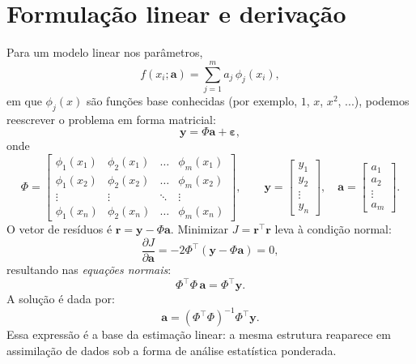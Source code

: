 \section{Formulação linear e derivação}
Para um modelo linear nos parâmetros,
\begin{equation}
f(x_i;\mathbf{a}) = \sum_{j=1}^{m} a_j \, \phi_j(x_i),
\label{eq:modelo-linear}
\end{equation}
em que $\phi_j(x)$ são funções base conhecidas (por exemplo, $1$, $x$, $x^2$, ...), podemos reescrever o problema em forma matricial:
\[
\mathbf{y} = \Phi \mathbf{a} + \boldsymbol{\varepsilon},
\]
onde
\[
\Phi =
\begin{bmatrix}
\phi_1(x_1) & \phi_2(x_1) & \dots & \phi_m(x_1) \\
\phi_1(x_2) & \phi_2(x_2) & \dots & \phi_m(x_2) \\
\vdots & \vdots & \ddots & \vdots \\
\phi_1(x_n) & \phi_2(x_n) & \dots & \phi_m(x_n)
\end{bmatrix},
\qquad
\mathbf{y} = 
\begin{bmatrix}
y_1 \\ y_2 \\ \vdots \\ y_n
\end{bmatrix},
\quad
\mathbf{a} = 
\begin{bmatrix}
a_1 \\ a_2 \\ \vdots \\ a_m
\end{bmatrix}.
\]
O vetor de resíduos é $\boldsymbol{r} = \mathbf{y} - \Phi\mathbf{a}$.  
Minimizar $J=\boldsymbol{r}^\top\boldsymbol{r}$ leva à condição normal:
\begin{equation}
\frac{\partial J}{\partial \mathbf{a}} = -2 \Phi^\top (\mathbf{y} - \Phi\mathbf{a}) = 0,
\label{eq:gradJ}
\end{equation}
resultando nas \emph{equações normais}:
\begin{equation}
\Phi^\top \Phi \, \mathbf{a} = \Phi^\top \mathbf{y}.
\label{eq:normal-equations}
\end{equation}
A solução é dada por:
\begin{equation}
\boxed{\mathbf{a} = (\Phi^\top \Phi)^{-1}\Phi^\top \mathbf{y}.}
\label{eq:LS-solution}
\end{equation}
Essa expressão é a base da estimação linear: a mesma estrutura reaparece em assimilação de dados sob a forma de análise estatística ponderada.

